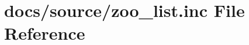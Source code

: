 \hypertarget{zoo__list_8inc}{}\section{docs/source/zoo\+\_\+list.inc File Reference}
\label{zoo__list_8inc}
